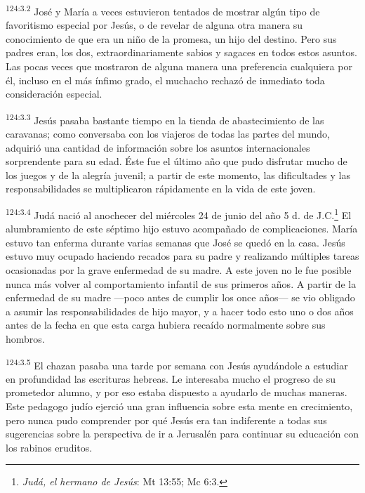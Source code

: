 \par
\textsuperscript{124:3.2} José y María a veces estuvieron tentados de mostrar algún tipo de favoritismo especial por Jesús, o de revelar de alguna otra manera su conocimiento de que era un niño de la promesa, un hijo del destino. Pero sus padres eran, los dos, extraordinariamente sabios y sagaces en todos estos asuntos. Las pocas veces que mostraron de alguna manera una preferencia cualquiera por él, incluso en el más ínfimo grado, el muchacho rechazó de inmediato toda consideración especial.

\par
\textsuperscript{124:3.3} Jesús pasaba bastante tiempo en la tienda de abastecimiento de las caravanas; como conversaba con los viajeros de todas las partes del mundo, adquirió una cantidad de información sobre los asuntos internacionales sorprendente para su edad. Éste fue el último año que pudo disfrutar mucho de los juegos y de la alegría juvenil; a partir de este momento, las dificultades y las responsabilidades se multiplicaron rápidamente en la vida de este joven.

\par
\textsuperscript{124:3.4} Judá nació al anochecer del miércoles 24 de junio del año 5 d. de J.C.\footnote{\textit{Judá, el hermano de Jesús}: Mt 13:55; Mc 6:3.} El alumbramiento de este séptimo hijo estuvo acompañado de complicaciones. María estuvo tan enferma durante varias semanas que José se quedó en la casa. Jesús estuvo muy ocupado haciendo recados para su padre y realizando múltiples tareas ocasionadas por la grave enfermedad de su madre. A este joven no le fue posible nunca más volver al comportamiento infantil de sus primeros años. A partir de la enfermedad de su madre ---poco antes de cumplir los once años--- se vio obligado a asumir las responsabilidades de hijo mayor, y a hacer todo esto uno o dos años antes de la fecha en que esta carga hubiera recaído normalmente sobre sus hombros.

\par
\textsuperscript{124:3.5} El chazan pasaba una tarde por semana con Jesús ayudándole a estudiar en profundidad las escrituras hebreas. Le interesaba mucho el progreso de su prometedor alumno, y por eso estaba dispuesto a ayudarlo de muchas maneras. Este pedagogo judío ejerció una gran influencia sobre esta mente en crecimiento, pero nunca pudo comprender por qué Jesús era tan indiferente a todas sus sugerencias sobre la perspectiva de ir a Jerusalén para continuar su educación con los rabinos eruditos.

